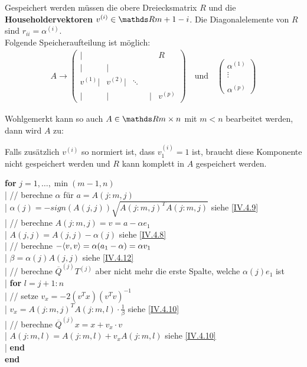Gespeichert werden müssen die obere Dreiecksmatrix $R$ und die 
\textbf{Householdervektoren} 
$v^{(i)}\in \R{m+1-i}$.
Die Diagonalelemente von $R$ sind $r_{ii} = \alpha^{(i)}$. \\
Folgende Speicheraufteilung ist möglich:
\begin{gather*}
  A \longrightarrow \left(
    \begin{array}{rrrrr}
      |&&& R \\
      |&| \\
      v^{(1)}| & v^{(2)}|&\ddots ~~\\
      | &|&\phantom{v^{(i)}}|& v^{(p)}			
    \end{array}
  \right)
  \quad \text{und} \quad 
  \begin{pmatrix}
    \alpha^{(1)} \\ \vdots \\ \\ \alpha^{(p)}
  \end{pmatrix}
\end{gather*}

Wohlgemerkt kann so auch $A\in \R{m\times n}$ mit $m<n$ bearbeitet werden,
dann wird $A$ zu:

\label{im4.4.5}

Falls zusätzlich $v^{(i)}$ so normiert ist,
dass $v_1^{(i)} = 1$ ist, braucht diese Komponente nicht gespeichert werden 
und $R$ kann komplett in $A$ gespeichert werden.



\begin{pseudocode}{\linewidth}
  \textbf{for} $j = 1,\dots, \min(m - 1, n)$ \\
  |	\>	// berechne $\alpha$ für $a = A(j : m, j)$ \\
  |	\>	$\alpha(j) = -sign(A(j, j))\sqrt{A(j:m, j)^T A(j:m, j)}$ \>\>\>\> siehe \eqref{IV.4.9}\\
  |	\>  // berechne $A(j:m,j)=v=a-\alpha e_1$ \\
  |	\>	$A(j,j)=A(j,j)-\alpha(j)$ \>\>\>\> siehe \eqref{IV.4.8}\\
  |	\> // berechne $-\langle v, v \rangle = \alpha(a_1 - \alpha) = \alpha v_1$ \\
  |	\> $\beta = \alpha(j)A(j, j)$\>\>\>\> siehe \eqref{IV.4.12}\\
  |	\> // berechne $\overline{Q}^{(j)}T^{(j)}$ 
  aber nicht mehr die erste Spalte, welche $\alpha(j)e_1$ ist\\
  |	\> \textbf{for} $l = j + 1 : n$\\
  |		\>\> // setze $v_x = -2{(v^Tx)}{(v^Tv)}^{-1}$\\
  |		\>\> $v_x = A(j : m, j)^TA(j:m,l)\cdot \frac{1}{\beta}$ \>\>\>siehe \eqref{IV.4.10}\\
  |		\>\> // berechne  $\overline{Q}^{(j)}x=x+v_x\cdot v$\\
  |		\>\> $A(j:m,l) = A(j:m,l)+v_xA(j:m,l)$ \>\>\> siehe \eqref{IV.4.10}\\
  |	\>\textbf{end}\\
  \textbf{end}
\end{pseudocode}


